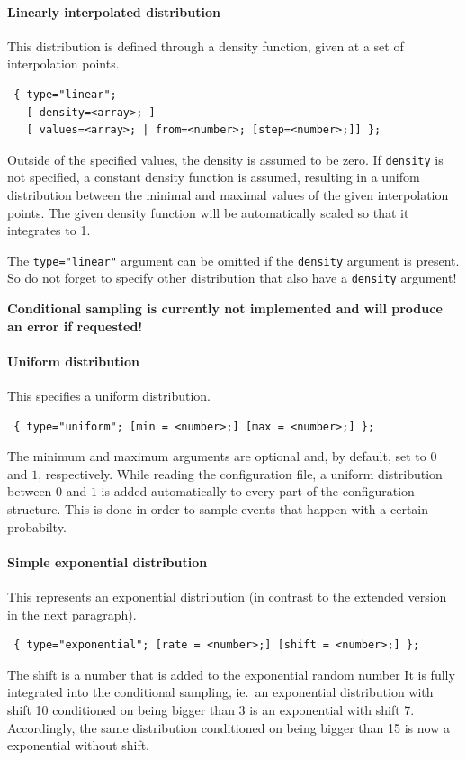 \documentclass[11pt]{article}
\begin{document}
\paragraph{Linearly interpolated distribution}

This distribution is defined through a density function, given at
a set of interpolation points.
\begin{verbatim}
 { type="linear";
   [ density=<array>; ] 
   [ values=<array>; | from=<number>; [step=<number>;]] };
\end{verbatim}
Outside of the specified values, the density is assumed to be zero. If
\texttt{density} is not specified, a constant density function is assumed,
resulting in a unifom distribution between the minimal and maximal values of
the given interpolation points. The given density function will be automatically
scaled so that it integrates to 1.

The \texttt{type="linear"} argument can be omitted if the \texttt{density}
argument is present. So do not forget to specify other distribution that also
have a \texttt{density} argument!

\textbf{Conditional sampling is currently not implemented and will produce an
error if requested!}

\paragraph{Uniform distribution}

This specifies a uniform distribution.
\begin{verbatim}
 { type="uniform"; [min = <number>;] [max = <number>;] };
\end{verbatim}
The minimum and maximum arguments are optional and, by default, set to $0$ and
$1$, respectively. While reading the configuration file, a uniform distribution
between $0$ and $1$ is added automatically to every part of the configuration
structure. This is done in order to sample events that happen with a certain
probabilty.

\paragraph{Simple exponential distribution}

This represents an exponential distribution (in contrast to the extended
version in the next paragraph). 
\begin{verbatim}
 { type="exponential"; [rate = <number>;] [shift = <number>;] };
\end{verbatim}
The shift is a number that is added to the exponential random number It is
fully integrated into the conditional sampling, ie.\ an exponential distribution
with shift 10 conditioned on being bigger than 3 is an exponential with shift
7. Accordingly, the same distribution conditioned on being bigger than 15 is
now a exponential without shift. 
\end{document}
